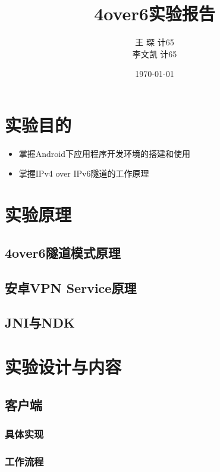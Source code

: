 \documentclass[paper=a4, fontsize=11pt, UTF8]{article} %
\title{\fontsize{18}\baselineskip 4over6实验报告}
\author{王 \; 琛 \quad 2016011360 \quad 计65\\ 李文凯\quad 2016011364 \quad 计65}
\date{\normalsize\today} %
\begin{document}
\maketitle %

\fontsize{11pt}{18pt}\selectfont

\section{实验目的}

\begin{itemize}
\item 掌握Android下应用程序开发环境的搭建和使用
\item 掌握IPv4 over IPv6隧道的工作原理
\end{itemize}


\section{实验原理}

\subsection{4over6隧道模式原理}

\subsection{安卓VPN Service原理}

\subsection{JNI与NDK}



\section{实验设计与内容}

\subsection{客户端}

\subsubsection{具体实现}

\subsubsection{工作流程}
\end{document}
